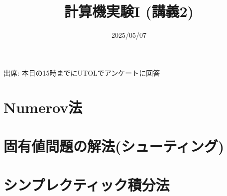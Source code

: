 \documentclass[10pt,dvipdfmx]{beamer}
\title{計算機実験I (講義2)}
\date{2025/05/07}
\begin{document}
\begin{frame}
  \titlepage
  \tableofcontents
  出席: 本日の15時までにUTOLでアンケートに回答
\end{frame}



\section{Numerov法}





\section{固有値問題の解法(シューティング)}




\section{シンプレクティック積分法}






% 
% 
% 





\section{}

\end{document}
